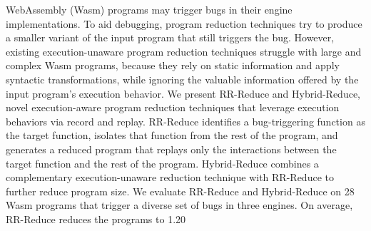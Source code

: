 \documentclass[a4paper,UKenglish]{dagrep-v2018}
\begin{document}
\license
{}

WebAssembly (Wasm) programs may trigger bugs in their engine implementations. To aid debugging, program reduction techniques try to produce a smaller variant of the input program that still triggers the bug. However, existing execution-unaware program reduction techniques struggle with large and complex Wasm programs, because they rely on static information and apply syntactic transformations, while ignoring the valuable information offered by the input program’s execution behavior. We present RR-Reduce and Hybrid-Reduce, novel execution-aware program reduction techniques that leverage execution behaviors via record and replay. RR-Reduce identifies a bug-triggering function as the target function, isolates that function from the rest of the program, and generates a reduced program that replays only the interactions between the target function and the rest of the program. Hybrid-Reduce combines a complementary execution-unaware reduction technique with RR-Reduce to further reduce program size. We evaluate RR-Reduce and Hybrid-Reduce on 28 Wasm programs that trigger a diverse set of bugs in three engines. On average, RR-Reduce reduces the programs to 1.20%

\license
{}
\end{document}
